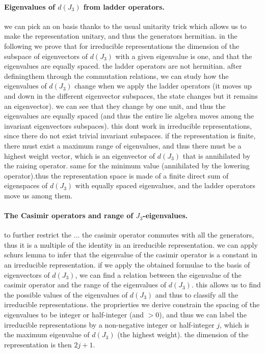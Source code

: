 \paragraph{Eigenvalues of \(d(J_3)\) from ladder operators.} we can pick an on basis thanks to the usual unitarity trick which allows us to make the representation unitary, and thus the generators hermitian. in the following we prove that for irreducible representations the dimension of the subspace of eigenvectors of \(d(J_3)\) with a given eigenvalue is one, and that the eigenvalues are equally spaced.
the ladder operators are not hermitian. after definingthem through the commutation relations, we can study how the eigenvalues of \(d(J_3)\) change when we apply the ladder operators (it moves up and down in the different eigenvector subspaces, the state changes but it remains an eigenvector). we can see that they change by one unit, and thus the eigenvalues are equally spaced (and thus the entire lie algebra moves among the invariant eigenvectors subspaces). this dont work in irreducible representations, since there do not exist trivial invariant subspaces.
if the representation is finite, there must exist a maximum range of eigenvalues, and thus there must be a highest weight vector, which is an eigenvector of \(d(J_3)\) that is annihilated by the raising operator. same for the minimum value (annihilated by the lowering operator).thus the representation space is made of a finite direct sum of eigenspaces of \(d(J_3)\) with equally spaced eigenvalues, and the ladder operators move us among them.

\paragraph{The Casimir operators and range of \(J_3\)-eigenvalues.} to further restrict the ...
the casimir operator commutes with all the generators, thus it is a multiple of the identity in an irreducible representation. we can apply schurs lemma to infer that the eigenvalue of the casimir operator is a constant in an irreducible representation.
if we apply the obtained formulae to the basis of eigenvectors of \(d(J_3)\), we can find a relation between the eigenvalue of the casimir operator and the range of the eigenvalues of \(d(J_3)\). this allows us to find the possible values of the eigenvalues of \(d(J_3)\) and thus to classify all the irreducible representations. the proprierties we derive constrain the spacing of the eigenvalues to be integer or half-integer (and \(>0\)), and thus we can label the irreducible representations by a non-negative integer or half-integer \(j\), which is the maximum eigenvalue of \(d(J_3)\) (the highest weight). the dimension of the representation is then \(2j+1\).

